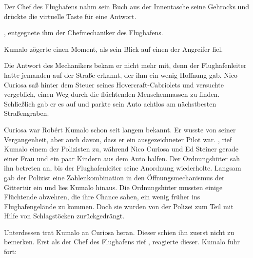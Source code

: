 Der Chef des Flughafens nahm sein Buch aus der Innentasche seine Gehrocks und drückte die virtuelle Taste für eine Antwort. 

\par

, entgegnete ihm der Chefmechaniker des Flughafens. 

\par

Kumalo zögerte einen Moment, als sein Blick auf einen der Angreifer fiel. 

\par

Die Antwort des Mechanikers bekam er nicht mehr mit, denn der Flughafenleiter hatte jemanden auf der Straße erkannt, der ihm ein wenig Hoffnung gab. Nico Curiosa saß hinter dem Steuer seines Hovercraft-Cabriolets und versuchte vergeblich, einen Weg durch die flüchtenden Menschenmassen zu finden. Schließlich gab er es auf und parkte sein Auto achtlos am nächstbesten Straßengraben.

\par

Curiosa war Robért Kumalo schon seit langem bekannt. Er wusste von seiner Vergangenheit, aber auch davon, dass er ein ausgezeichneter Pilot war.
\ortswechsel
{}, rief Kumalo einem der Polizisten zu, während Nico Curiosa und Ed Steiner gerade einer Frau und ein paar Kindern aus dem Auto halfen. Der Ordnungshüter sah ihn betreten an, bis der Flughafenleiter seine Anordnung wiederholte. Langsam gab der Polizist eine Zahlenkombination in den Öffnungsmechanismus der Gittertür ein und lies Kumalo hinaus. Die Ordnungshüter mussten einige Flüchtende abwehren, die ihre Chance sahen, ein wenig früher ins Flughafengelände zu kommen. Doch sie wurden von der Polizei zum Teil mit Hilfe von Schlagstöcken zurückgedrängt.

\par

Unterdessen trat Kumalo an Curiosa heran. Dieser schien ihn zuerst nicht zu bemerken. Erst als der Chef des Flughafens rief , reagierte dieser. Kumalo fuhr fort: 

\par

